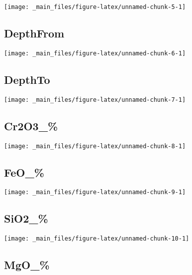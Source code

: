\documentclass[
]{article}
\begin{document}
\begin{center}\texttt{[image: \_main\_files/figure-latex/unnamed-chunk-5-1]} \end{center}

\hypertarget{depthfrom}{%
\subsection{DepthFrom}\label{depthfrom}}

\begin{center}\texttt{[image: \_main\_files/figure-latex/unnamed-chunk-6-1]} \end{center}

\hypertarget{depthto}{%
\subsection{DepthTo}\label{depthto}}

\begin{center}\texttt{[image: \_main\_files/figure-latex/unnamed-chunk-7-1]} \end{center}

\hypertarget{cr2o3_}{%
\subsection{Cr2O3\_\%}\label{cr2o3_}}

\begin{center}\texttt{[image: \_main\_files/figure-latex/unnamed-chunk-8-1]} \end{center}

\hypertarget{feo_}{%
\subsection{FeO\_\%}\label{feo_}}

\begin{center}\texttt{[image: \_main\_files/figure-latex/unnamed-chunk-9-1]} \end{center}

\hypertarget{sio2_}{%
\subsection{SiO2\_\%}\label{sio2_}}

\begin{center}\texttt{[image: \_main\_files/figure-latex/unnamed-chunk-10-1]} \end{center}

\hypertarget{mgo_}{%
\subsection{MgO\_\%}\label{mgo_}}
\end{document}

